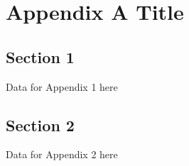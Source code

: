 \chapter{Appendix A Title}
\label{chp:appA}

\section{Section 1}
Data for Appendix 1 here

\section{Section 2}
Data for Appendix 2 here
